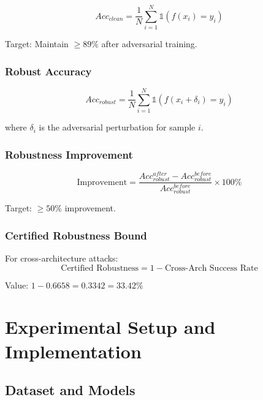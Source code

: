 \documentclass[10pt,conference]{IEEEtran}
\begin{document}
\begin{equation}
Acc_{clean} = \frac{1}{N} \sum_{i=1}^{N} \mathbb{1}(f(x_i) = y_i)
\label{eq:clean_acc}
\end{equation}

Target: Maintain $\geq 89\%$ after adversarial training.

\subsubsection{Robust Accuracy}

\begin{equation}
Acc_{robust} = \frac{1}{N} \sum_{i=1}^{N} \mathbb{1}(f(x_i + \delta_i) = y_i)
\label{eq:robust_acc}
\end{equation}

where $\delta_i$ is the adversarial perturbation for sample $i$.

\subsubsection{Robustness Improvement}

\begin{equation}
\text{Improvement} = \frac{Acc_{robust}^{after} - Acc_{robust}^{before}}{Acc_{robust}^{before}} \times 100\%
\label{eq:improvement}
\end{equation}

Target: $\geq 50\%$ improvement.

\subsubsection{Certified Robustness Bound}

For cross-architecture attacks:
\begin{equation}
\text{Certified Robustness} = 1 - \text{Cross-Arch Success Rate}
\label{eq:certified}
\end{equation}

Value: $1 - 0.6658 = 0.3342 = 33.42\%$

\section{Experimental Setup and Implementation}

\subsection{Dataset and Models}
\end{document}
